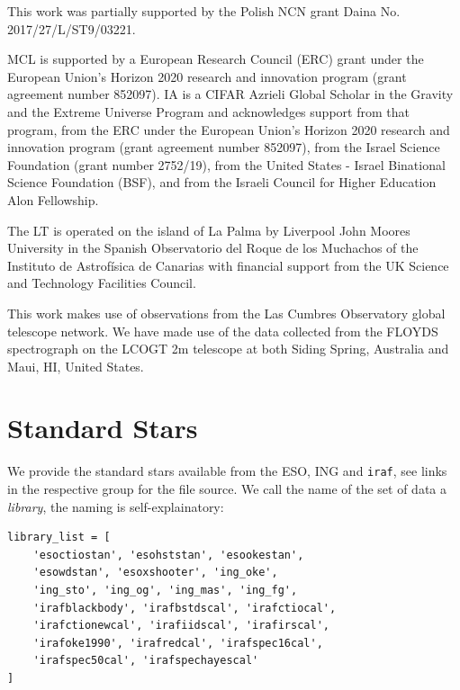 \documentclass[fleqn,usenatbib]{mnras}
\begin{document}
This work was partially supported by the Polish NCN grant Daina
No. 2017/27/L/ST9/03221.

MCL is supported by a European Research Council (ERC) grant under the European Union’s Horizon 2020 research and innovation program (grant agreement number 852097).
IA is a CIFAR Azrieli Global Scholar in the Gravity and the Extreme Universe Program and acknowledges support from that program, from the ERC under the European Union’s Horizon 2020 research and innovation program (grant agreement number 852097), from the Israel Science Foundation (grant number 2752/19), from the United States - Israel Binational Science Foundation (BSF), and from the Israeli Council for Higher Education Alon Fellowship.

The LT is operated on the island of La Palma by Liverpool
John Moores University in the Spanish Observatorio del Roque
de los Muchachos of the Instituto de Astrof{\'i}sica de Canarias with
financial support from the UK Science and Technology Facilities
Council.

This work makes use of observations from the Las Cumbres Observatory
global telescope network. We have made use of the data collected from
the FLOYDS spectrograph on the LCOGT 2m telescope at both Siding Spring,
Australia and Maui, HI, United States.







\appendix

\section{Standard Stars}
\label{appendix:standards}
We provide the standard stars available from the ESO, ING and \texttt{iraf}, see
links in the respective group for the file source. We call the name of the set of
data a \textit{library}, the naming is self-explainatory:

\begin{verbatim}
library_list = [
    'esoctiostan', 'esohststan', 'esookestan',
    'esowdstan', 'esoxshooter', 'ing_oke',
    'ing_sto', 'ing_og', 'ing_mas', 'ing_fg',
    'irafblackbody', 'irafbstdscal', 'irafctiocal',
    'irafctionewcal', 'irafiidscal', 'irafirscal',
    'irafoke1990', 'irafredcal', 'irafspec16cal',
    'irafspec50cal', 'irafspechayescal'
]
\end{verbatim}
\end{document}
